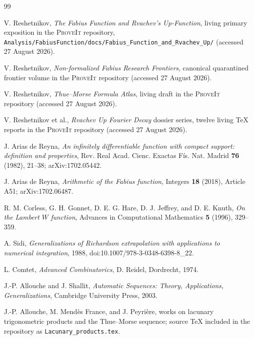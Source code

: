 \documentclass[11pt]{article}
\theoremstyle{definition}
\theoremstyle{remark}
\newcommand{\repo}{\textsc{ProveIt}}
\begin{document}
\begin{thebibliography}{99}

V. Reshetnikov,
\emph{The Fabius Function and Rvachev's Up-Function},
living primary exposition in the \repo{} repository,
\texttt{Analysis/FabiusFunction/docs/Fabius\_Function\_and\_Rvachev\_Up/} (accessed 27 August 2026).

V. Reshetnikov,
\emph{Non-formalized Fabius Research Frontiers},
canonical quarantined frontier volume in the \repo{} repository
(accessed 27 August 2026).

V. Reshetnikov,
\emph{Thue--Morse Formula Atlas},
living draft in the \repo{} repository
(accessed 27 August 2026).

V. Reshetnikov et al.,
\emph{Rvachev Up Fourier Decay} dossier series,
twelve living TeX reports in the \repo{} repository
(accessed 27 August 2026).

J. Arias de Reyna,
\emph{An infinitely differentiable function with compact support: definition and properties},
Rev. Real Acad. Cienc. Exactas F\'is. Nat. Madrid \textbf{76} (1982), 21--38;
arXiv:1702.05442.

J. Arias de Reyna,
\emph{Arithmetic of the Fabius function},
Integers \textbf{18} (2018), Article A51;
arXiv:1702.06487.

R. M. Corless, G. H. Gonnet, D. E. G. Hare, D. J. Jeffrey, and D. E. Knuth,
\emph{On the Lambert $W$ function},
Advances in Computational Mathematics \textbf{5} (1996), 329--359.

A. Sidi,
\emph{Generalizations of Richardson extrapolation with applications to numerical integration},
1988, doi:10.1007/978-3-0348-6398-8\_22.

L. Comtet,
\emph{Advanced Combinatorics},
D. Reidel, Dordrecht, 1974.

J.-P. Allouche and J. Shallit,
\emph{Automatic Sequences: Theory, Applications, Generalizations},
Cambridge University Press, 2003.

J.-P. Allouche, M. Mend\`es France, and J. Peyri\`ere,
works on lacunary trigonometric products and the Thue--Morse sequence;
source TeX included in the repository as \texttt{Lacunary\_products.tex}.

\end{thebibliography}
\end{document}
